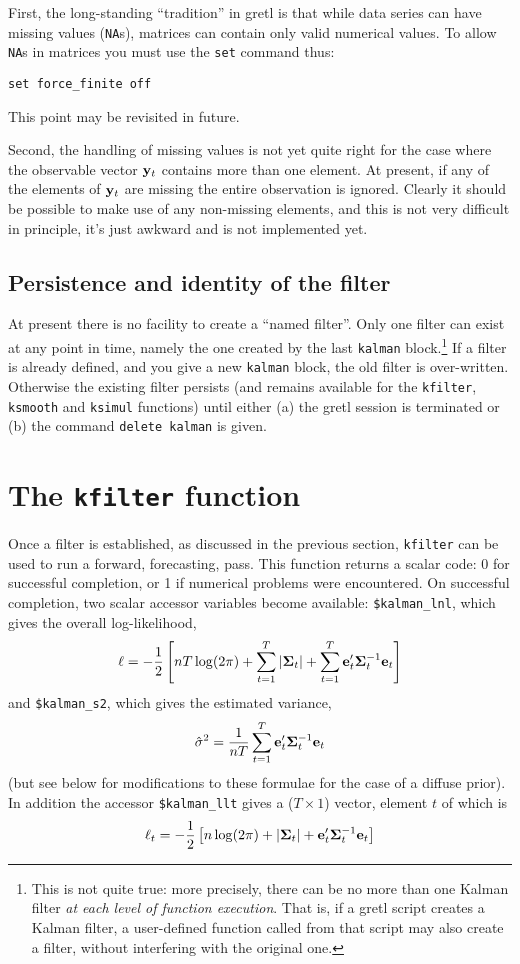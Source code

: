 \documentclass[a4paper]{article}
\newcommand{\obsvec}{\ensuremath\mathbf{y}}
\newcommand{\prederr}{\ensuremath\mathbf{e}}
\newcommand{\predvar}{\ensuremath{\bm\Sigma}}
\begin{document}
First, the long-standing ``tradition'' in gretl is that while data
series can have missing values (\texttt{NA}s), matrices can contain
only valid numerical values.  To allow \texttt{NA}s in matrices you
must use the \texttt{set} command thus:
%
\begin{verbatim}
set force_finite off
\end{verbatim}
%
This point may be revisited in future.  

Second, the handling of missing values is not yet quite right for the
case where the observable vector $\obsvec_t$ contains more than one
element.  At present, if any of the elements of $\obsvec_t$ are
missing the entire observation is ignored.  Clearly it should be
possible to make use of any non-missing elements, and this is not
very difficult in principle, it's just awkward and is not
implemented yet.

\subsection{Persistence and identity of the filter}

At present there is no facility to create a ``named filter''.  Only
one filter can exist at any point in time, namely the one created by
the last \texttt{kalman} block.\footnote{This is not quite true: more
  precisely, there can be no more than one Kalman filter \textit{at
    each level of function execution}.  That is, if a gretl script
  creates a Kalman filter, a user-defined function called from that
  script may also create a filter, without interfering with the
  original one.}  If a filter is already defined, and you give a new
\texttt{kalman} block, the old filter is over-written.  Otherwise the
existing filter persists (and remains available for the
\texttt{kfilter}, \texttt{ksmooth} and \texttt{ksimul} functions)
until either (a) the gretl session is terminated or (b) the command
\texttt{delete kalman} is given.


\section{The \texttt{kfilter} function}

Once a filter is established, as discussed in the previous section,
\texttt{kfilter} can be used to run a forward, forecasting, pass.
This function returns a scalar code: 0 for successful completion, or 1
if numerical problems were encountered.  On successful completion, two
scalar accessor variables become available: \verb+$kalman_lnl+, which
gives the overall log-likelihood,
%
\[
  \ell = -\frac{1}{2} \left[nT \log(2 \pi) + \sum_{t=1}^T\left|\predvar_t\right| + 
    \sum_{t=1}^T\prederr_t'\predvar_t^{-1} \prederr_t
  \right]
\]
%
and \verb+$kalman_s2+, which gives the estimated variance,
%
\[
\hat{\sigma}^2 = \frac{1}{nT} 
   \sum_{t=1}^T\prederr_t'\predvar_t^{-1} \prederr_t
\]
(but see below for modifications to these formulae for the case of a
diffuse prior).  In addition the accessor \verb+$kalman_llt+ gives a
($T \times 1$) vector, element $t$ of which is
%
\[
  \ell_t = -\frac{1}{2} \left[n \log(2 \pi) + \left|\predvar_t\right| + 
    \prederr_t'\predvar_t^{-1} \prederr_t
  \right]
\]
%
\end{document}
